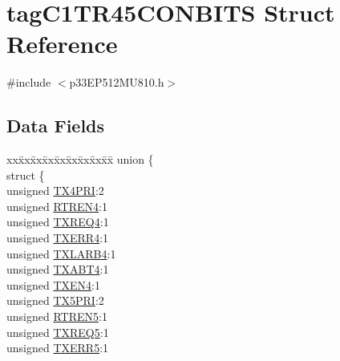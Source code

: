 \hypertarget{structtag_c1_t_r45_c_o_n_b_i_t_s}{}\section{tag\+C1\+T\+R45\+C\+O\+N\+B\+I\+TS Struct Reference}
\label{structtag_c1_t_r45_c_o_n_b_i_t_s}


{\ttfamily \#include $<$p33\+E\+P512\+M\+U810.\+h$>$}

\subsection*{Data Fields}
\begin{DoxyCompactItemize}
\item 
\begin{tabbing}
xx\=xx\=xx\=xx\=xx\=xx\=xx\=xx\=xx\=\kill
union \{\\
\>struct \{\\
\>\>unsigned \hyperlink{structtag_c1_t_r45_c_o_n_b_i_t_s_aa6a3ee143c244d8467173cdc1a992e38}{TX4PRI}:2\\
\>\>unsigned \hyperlink{structtag_c1_t_r45_c_o_n_b_i_t_s_a6821840feab6970b1d70407f2e085551}{RTREN4}:1\\
\>\>unsigned \hyperlink{structtag_c1_t_r45_c_o_n_b_i_t_s_adf240a43f250ec1a7e61ad9e8b9a8ffc}{TXREQ4}:1\\
\>\>unsigned \hyperlink{structtag_c1_t_r45_c_o_n_b_i_t_s_aeb970a99d6cdd83ddbc7fba3158ea609}{TXERR4}:1\\
\>\>unsigned \hyperlink{structtag_c1_t_r45_c_o_n_b_i_t_s_a20d182e6218696116b9b3b9ef02f5b29}{TXLARB4}:1\\
\>\>unsigned \hyperlink{structtag_c1_t_r45_c_o_n_b_i_t_s_ae5a87ed6b4b9f0a65971312ef28e08b4}{TXABT4}:1\\
\>\>unsigned \hyperlink{structtag_c1_t_r45_c_o_n_b_i_t_s_a0e6f0b5f915a779257b109817ea4832b}{TXEN4}:1\\
\>\>unsigned \hyperlink{structtag_c1_t_r45_c_o_n_b_i_t_s_aa448f4e4890ce5c63e40547679abea9e}{TX5PRI}:2\\
\>\>unsigned \hyperlink{structtag_c1_t_r45_c_o_n_b_i_t_s_a935e79e3658a0008f27ca776bbf0419c}{RTREN5}:1\\
\>\>unsigned \hyperlink{structtag_c1_t_r45_c_o_n_b_i_t_s_a9ad70609ad3034a380a9fa1ad06e7d17}{TXREQ5}:1\\
\>\>unsigned \hyperlink{structtag_c1_t_r45_c_o_n_b_i_t_s_ac5fd698af5ab6b21b802527453c0c117}{TXERR5}:1\\

\end{tabbing}
\end{DoxyCompactItemize}

